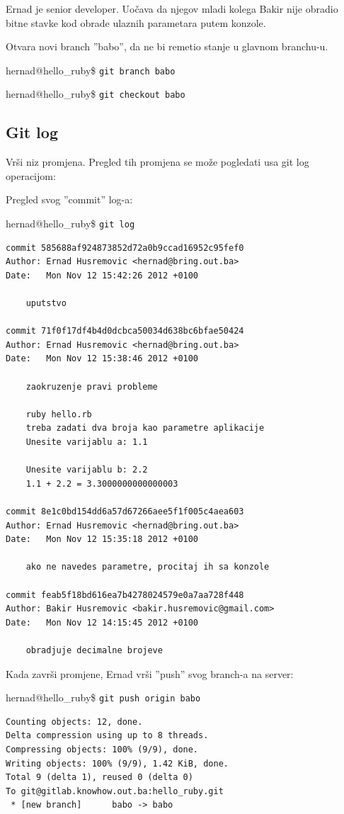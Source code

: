 \documentclass[times, utf8, seminar]{fit}
\begin{document}
Ernad je senior developer. Uočava da njegov mladi kolega Bakir nije obradio bitne stavke kod obrade ulaznih parametara putem konzole.

Otvara novi branch ''babo'', da ne bi remetio stanje u glavnom branchu-u.

hernad@hello\_ruby\$ \texttt{git branch babo}

hernad@hello\_ruby\$ \texttt{git checkout babo}

\subsection{Git log}

Vrši niz promjena. Pregled tih promjena se može pogledati usa git log operacijom:

Pregled svog ''commit'' log-a:

hernad@hello\_ruby\$ \texttt{git log}
\begin{lstlisting}
commit 585688af924873852d72a0b9ccad16952c95fef0
Author: Ernad Husremovic <hernad@bring.out.ba>
Date:   Mon Nov 12 15:42:26 2012 +0100

    uputstvo

commit 71f0f17df4b4d0dcbca50034d638bc6bfae50424
Author: Ernad Husremovic <hernad@bring.out.ba>
Date:   Mon Nov 12 15:38:46 2012 +0100

    zaokruzenje pravi probleme
    
    ruby hello.rb
    treba zadati dva broja kao parametre aplikacije
    Unesite varijablu a: 1.1
    
    Unesite varijablu b: 2.2
    1.1 + 2.2 = 3.3000000000000003

commit 8e1c0bd154dd6a57d67266aee5f1f005c4aea603
Author: Ernad Husremovic <hernad@bring.out.ba>
Date:   Mon Nov 12 15:35:18 2012 +0100

    ako ne navedes parametre, procitaj ih sa konzole

commit feab5f18bd616ea7b4278024579e0a7aa728f448
Author: Bakir Husremovic <bakir.husremovic@gmail.com>
Date:   Mon Nov 12 14:15:45 2012 +0100

    obradjuje decimalne brojeve
\end{lstlisting}

Kada završi promjene, Ernad vrši ''push'' svog branch-a na server:

hernad@hello\_ruby\$ \texttt{git push origin babo}
\begin{lstlisting}
Counting objects: 12, done.
Delta compression using up to 8 threads.
Compressing objects: 100% (9/9), done.
Writing objects: 100% (9/9), 1.42 KiB, done.
Total 9 (delta 1), reused 0 (delta 0)
To git@gitlab.knowhow.out.ba:hello_ruby.git
 * [new branch]      babo -> babo
\end{lstlisting}
\end{document}
